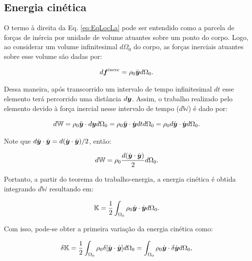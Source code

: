 \subsection{Energia cinética}

O termo à direita da Eq. \eqref{eq:EqLocLa} pode ser entendido como a parcela de forças de inércia por unidade de volume atuantes sobre um ponto do corpo. Logo, ao considerar um volume infinitesimal $d\Omega_0$ do corpo, as forças inerciais atuantes sobre esse volume são dadas por:

\begin{equation}
    d\boldsymbol{f}^\mathrm{inerc}=\rho_0\ddot{\boldsymbol{y}}d\Omega_0\text{.}
\end{equation}

Dessa maneira, após transcorrido um intervalo de tempo infinitesimal $dt$ esse elemento terá percorrido uma distância $d\boldsymbol{y}$. Assim, o trabalho realizado pelo elemento devido à força inercial nesse intervalo de tempo ($d\mathbb{W}$) é dado por:

\begin{equation}
    d\mathbb{W}=\rho_0\ddot{\boldsymbol{y}}\cdot d\boldsymbol{y}d\Omega_0=\rho_0\ddot{\boldsymbol{y}}\cdot\dot{\boldsymbol{y}}dtd\Omega_0=\rho_0d\dot{\boldsymbol{y}}\cdot\dot{\boldsymbol{y}}d\Omega_0\text{.}
\end{equation}

Note que $d\dot{\boldsymbol{y}}\cdot\dot{\boldsymbol{y}}=d(\dot{\boldsymbol{y}}\cdot\dot{\boldsymbol{y}})/2$, então:

\begin{equation}
    d\mathbb{W}=\rho_0\frac{d(\dot{\boldsymbol{y}}\cdot\dot{\boldsymbol{y}})}{2}d\Omega_0\text{.}
\end{equation}

Portanto, a partir do teorema do trabalho-energia, a energia cinética é obtida integrando $d\mathbb{W}$ resultando em:

\begin{equation}
    \mathbb{K}=\frac{1}{2}\int_{\Omega_0}{\rho_0\dot{\boldsymbol{y}}\cdot\dot{\boldsymbol{y}}d\Omega_0}\text{.}
\end{equation}

Com isso, pode-se obter a primeira variação da energia cinética como:

\begin{equation}
    \delta\mathbb{K}=\frac{1}{2}\int_{\Omega_0}{\rho_0\delta[\dot{\boldsymbol{y}}\cdot\dot{\boldsymbol{y}}]d\Omega_0}=\int_{\Omega_0}{\rho_0\dot{\boldsymbol{y}}\cdot\delta\dot{\boldsymbol{y}}d\Omega_0}\text{,}
\end{equation}


